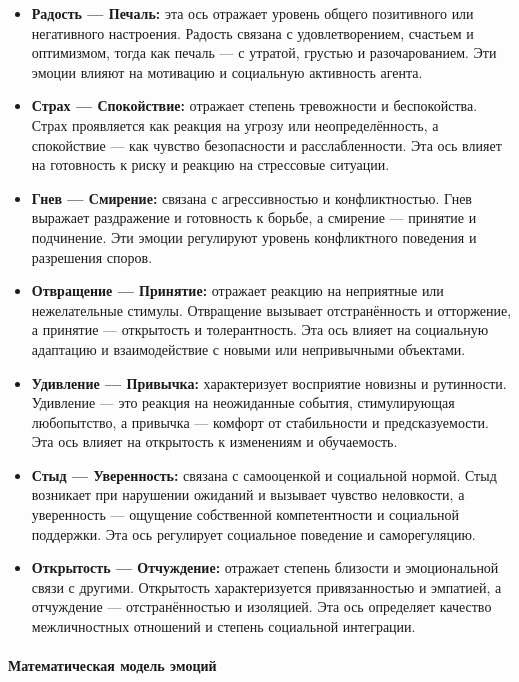 \documentclass[12pt]{article}
\begin{document}
\begin{itemize}
    \item \textbf{Радость — Печаль:} эта ось отражает уровень общего позитивного или негативного настроения. Радость связана с удовлетворением, счастьем и оптимизмом, тогда как печаль — с утратой, грустью и разочарованием. Эти эмоции влияют на мотивацию и социальную активность агента.
    \item \textbf{Страх — Спокойствие:} отражает степень тревожности и беспокойства. Страх проявляется как реакция на угрозу или неопределённость, а спокойствие — как чувство безопасности и расслабленности. Эта ось влияет на готовность к риску и реакцию на стрессовые ситуации.
    \item \textbf{Гнев — Смирение:} связана с агрессивностью и конфликтностью. Гнев выражает раздражение и готовность к борьбе, а смирение — принятие и подчинение. Эти эмоции регулируют уровень конфликтного поведения и разрешения споров.
    \item \textbf{Отвращение — Принятие:} отражает реакцию на неприятные или нежелательные стимулы. Отвращение вызывает отстранённость и отторжение, а принятие — открытость и толерантность. Эта ось влияет на социальную адаптацию и взаимодействие с новыми или непривычными объектами.
    \item \textbf{Удивление — Привычка:} характеризует восприятие новизны и рутинности. Удивление — это реакция на неожиданные события, стимулирующая любопытство, а привычка — комфорт от стабильности и предсказуемости. Эта ось влияет на открытость к изменениям и обучаемость.
    \item \textbf{Стыд — Уверенность:} связана с самооценкой и социальной нормой. Стыд возникает при нарушении ожиданий и вызывает чувство неловкости, а уверенность — ощущение собственной компетентности и социальной поддержки. Эта ось регулирует социальное поведение и саморегуляцию.
    \item \textbf{Открытость — Отчуждение:} отражает степень близости и эмоциональной связи с другими. Открытость характеризуется привязанностью и эмпатией, а отчуждение — отстранённостью и изоляцией. Эта ось определяет качество межличностных отношений и степень социальной интеграции.
\end{itemize}

\paragraph{Математическая модель эмоций}
\end{document}
